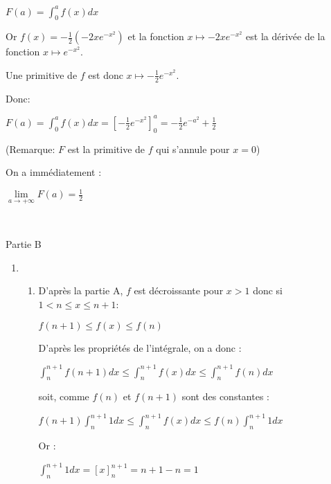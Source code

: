 \begin{corrige}
\begin{enumerate}
          \par
          $F\left(a\right)=\int_{0}^{a}f\left(x\right)dx$
          \par
          Or $f\left(x\right)=-\frac{1}{2}\left(-2xe^{-x^{2}}\right)$ et la fonction $x\mapsto -2xe^{-x^{2}}$ est la dérivée de la fonction $x\mapsto e^{-x^{2}}$.
          \par
          Une primitive de $f$ est donc $x\mapsto -\frac{1}{2}e^{-x^{2}}$.
          \par
          Donc:
          \par
          $F\left(a\right)=\int_{0}^{a}f\left(x\right)dx=\left[-\frac{1}{2}e^{-x^{2}}\right]_{0}^{a}=-\frac{1}{2}e^{-a^{2}}+\frac{1}{2}$
          \par
          (Remarque: $F$ est la primitive de $f$ qui s'annule pour $x=0$)
          \par
          On a immédiatement :
          \par
          $\lim\limits_{a\rightarrow +\infty }F\left(a\right)=\frac{1}{2}$
     \end{enumerate}
      
     \begin{h3}Partie B\end{h3}
     \begin{enumerate}
          \item
          \begin{enumerate}[label=\alph*.]
               \item
               D'après la partie A, $f$ est décroissante pour $x > 1$ donc si $1 < n \leqslant  x \leqslant  n+1$:
               \par
               $f\left(n+1\right) \leqslant  f\left(x\right) \leqslant  f\left(n\right)$
               \par
               D'après les propriétés de l'intégrale, on a donc  :
               \par
               $\int_{n}^{n+1}f\left(n+1\right)dx \leqslant  \int_{n}^{n+1}f\left(x\right)dx \leqslant  \int_{n}^{n+1}f\left(n\right)dx$
               \par
               soit, comme $f\left(n\right)$ et $f\left(n+1\right)$ sont des constantes :
               \par
               $f\left(n+1\right)\int_{n}^{n+1}1dx \leqslant  \int_{n}^{n+1}f\left(x\right)dx \leqslant  f\left(n\right)\int_{n}^{n+1}1dx$
               \par
               Or :
               \par
               $\int_{n}^{n+1}1dx=\left[x\right]_{n}^{n+1}=n+1-n=1$

\end{enumerate}
\end{enumerate}
\end{corrige}
